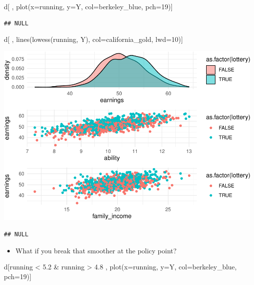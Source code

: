\documentclass[
]{article}
\newenvironment{Shaded}{\begin{snugshade}}{\end{snugshade}}
\newcommand{\AttributeTok}[1]{\textcolor[rgb]{0.77,0.63,0.00}{#1}}
\newcommand{\DecValTok}[1]{\textcolor[rgb]{0.00,0.00,0.81}{#1}}
\newcommand{\FloatTok}[1]{\textcolor[rgb]{0.00,0.00,0.81}{#1}}
\newcommand{\FunctionTok}[1]{\textcolor[rgb]{0.00,0.00,0.00}{#1}}
\newcommand{\NormalTok}[1]{#1}
\newcommand{\SpecialCharTok}[1]{\textcolor[rgb]{0.00,0.00,0.00}{#1}}
\providecommand{\tightlist}{%
  \setlength{\itemsep}{0pt}\setlength{\parskip}{0pt}}
\begin{document}
\begin{Shaded}
\begin{Highlighting}[]
\NormalTok{d[ , }\FunctionTok{plot}\NormalTok{(}\AttributeTok{x=}\NormalTok{running, }\AttributeTok{y=}\NormalTok{Y, }\AttributeTok{col=}\NormalTok{berkeley\_blue, }\AttributeTok{pch=}\DecValTok{19}\NormalTok{)]}
\end{Highlighting}
\end{Shaded}

\begin{verbatim}
## NULL
\end{verbatim}

\begin{Shaded}
\begin{Highlighting}[]
\NormalTok{  d[ , }\FunctionTok{lines}\NormalTok{(}\FunctionTok{lowess}\NormalTok{(running, Y), }\AttributeTok{col=}\NormalTok{california\_gold, }\AttributeTok{lwd=}\DecValTok{10}\NormalTok{)]}
\end{Highlighting}
\end{Shaded}

\includegraphics{241-live-session_files/figure-latex/unnamed-chunk-23-1.pdf}

\begin{verbatim}
## NULL
\end{verbatim}

\begin{itemize}
\tightlist
\item
  What if you break that smoother at the policy point?
\end{itemize}

\begin{Shaded}
\begin{Highlighting}[]
\NormalTok{  d[running }\SpecialCharTok{\textless{}} \FloatTok{5.2} \SpecialCharTok{\&}\NormalTok{ running }\SpecialCharTok{\textgreater{}} \FloatTok{4.8}\NormalTok{ , }\FunctionTok{plot}\NormalTok{(}\AttributeTok{x=}\NormalTok{running, }\AttributeTok{y=}\NormalTok{Y, }\AttributeTok{col=}\NormalTok{berkeley\_blue, }\AttributeTok{pch=}\DecValTok{19}\NormalTok{)]}
\end{Highlighting}
\end{Shaded}
\end{document}
